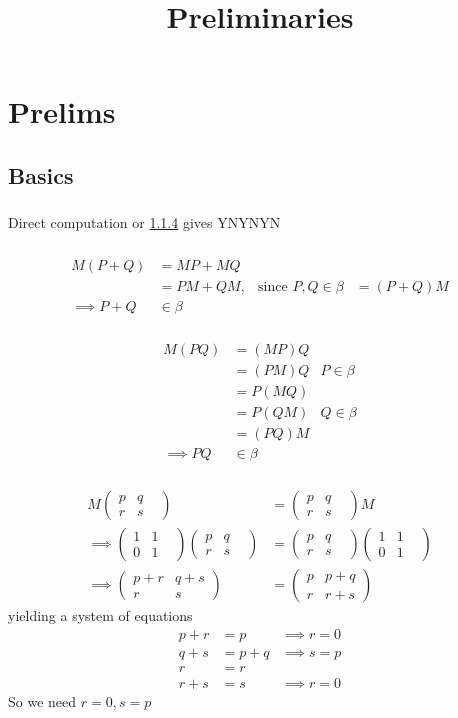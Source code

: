 \documentclass{article}
\title{Preliminaries}
\begin{document}
\vspace{-5em}

\section{Prelims}
\subsection{Basics}
\subsubsection{}
Direct computation or \ref{0p1p4} gives YNYNYN
\subsubsection{}
\begin{align*}
M(P+Q) &= MP + MQ\\
&= PM + QM, & \text{since $P,Q \in \beta$}
&= (P+Q)M\\
\implies P + Q &\in \beta
\end{align*}
\subsubsection{}
\begin{align*}
M(PQ) &= (MP)Q\\
&= (PM)Q & P \in \beta\\
&=P(MQ)\\
&= P(QM) & Q \in \beta\\
&= (PQ)M\\
\implies PQ &\in \beta
\end{align*}
\subsubsection{}\label{0p1p4}
\newcommand{\betamat}{\begin{pmatrix}1&1&\\0&1\end{pmatrix}}
\newcommand{\pqrs}{\begin{pmatrix}p&q&\\r&s\end{pmatrix}}
\begin{align*}
M\pqrs &= \pqrs M\\
\implies \betamat\pqrs &= \pqrs\betamat\\
\implies
\begin{pmatrix}
p+r&q+s\\r&s
\end{pmatrix}
&= 
\begin{pmatrix}
p&p+q\\r&r+s
\end{pmatrix}
\end{align*}
yielding a system of equations
\begin{align*}
p+r &=p &\implies r=0\\
q+s &= p+q &\implies s=p\\
r &= r\\
r+s &= s &\implies r = 0
\end{align*}
So we need $r=0, s=p$
\end{document}

